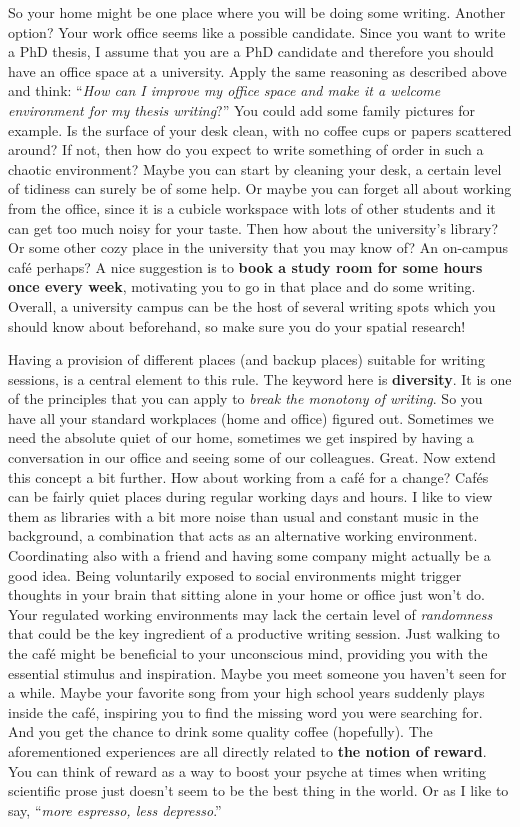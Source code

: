 \documentclass[
  12pt,
  oneside]{book}
\begin{document}
So your home might be one place where you will be doing some writing.
Another option?
Your work office seems like a possible candidate.
Since you want to write a PhD thesis, I assume that you are a PhD candidate and therefore you should have an office space at a university.
Apply the same reasoning as described above and think: ``\emph{How can I improve my office space and make it a welcome environment for my thesis writing}?''
You could add some family pictures for example.
Is the surface of your desk clean, with no coffee cups or papers scattered around?
If not, then how do you expect to write something of order in such a chaotic environment?
Maybe you can start by cleaning your desk, a certain level of tidiness can surely be of some help.
Or maybe you can forget all about working from the office, since it is a cubicle workspace with lots of other students and it can get too much noisy for your taste.
Then how about the university's library?
Or some other cozy place in the university that you may know of?
An on-campus café perhaps?
A nice suggestion is to \textbf{book a study room for some hours once every week}, motivating you to go in that place and do some writing.
Overall, a university campus can be the host of several writing spots which you should know about beforehand, so make sure you do your spatial research!

Having a provision of different places (and backup places) suitable for writing sessions, is a central element to this rule.
The keyword here is \textbf{diversity}.
It is one of the principles that you can apply to \emph{break the monotony of writing}.
So you have all your standard workplaces (home and office) figured out.
Sometimes we need the absolute quiet of our home, sometimes we get inspired by having a conversation in our office and seeing some of our colleagues.
Great.
Now extend this concept a bit further.
How about working from a café for a change?
Cafés can be fairly quiet places during regular working days and hours.
I like to view them as libraries with a bit more noise than usual and constant music in the background, a combination that acts as an alternative working environment.
Coordinating also with a friend and having some company might actually be a good idea.
Being voluntarily exposed to social environments might trigger thoughts in your brain that sitting alone in your home or office just won't do.
Your regulated working environments may lack the certain level of \emph{randomness} that could be the key ingredient of a productive writing session.
Just walking to the café might be beneficial to your unconscious mind, providing you with the essential stimulus and inspiration.
Maybe you meet someone you haven't seen for a while.
Maybe your favorite song from your high school years suddenly plays inside the café, inspiring you to find the missing word you were searching for.
And you get the chance to drink some quality coffee (hopefully).
The aforementioned experiences are all directly related to \textbf{the notion of reward}.
You can think of reward as a way to boost your psyche at times when writing scientific prose just doesn't seem to be the best thing in the world.
Or as I like to say, ``\emph{more espresso, less depresso}.''
\end{document}
